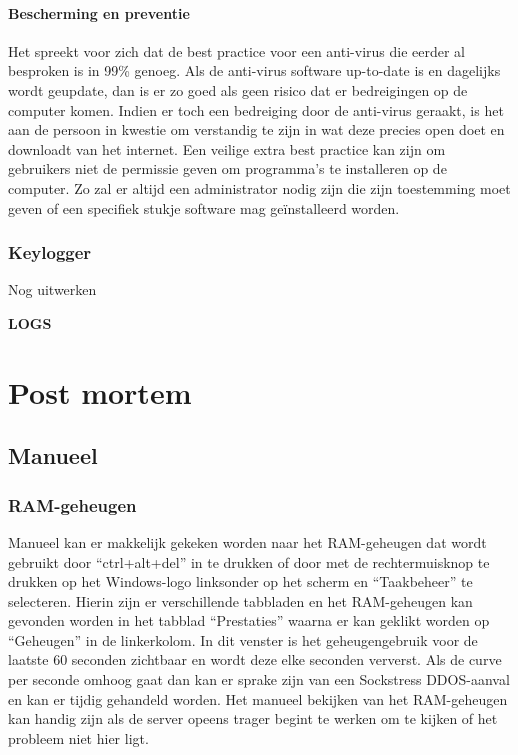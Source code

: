 \documentclass[pdftex,a4paper,12pt]{report}
\begin{document}
\subsubsection{Bescherming en preventie}
Het spreekt voor zich dat de best practice voor een anti-virus die eerder al besproken is in 99\% genoeg. Als de anti-virus software up-to-date is en dagelijks wordt geupdate, dan is er zo goed als geen risico dat er bedreigingen op de computer komen. Indien er toch een bedreiging door de anti-virus geraakt, is het aan de persoon in kwestie om verstandig te zijn in wat deze precies open doet en downloadt van het internet. Een veilige extra best practice kan zijn om gebruikers niet de permissie geven om programma's te installeren op de computer. Zo zal er altijd een administrator nodig zijn die zijn toestemming moet geven of een specifiek stukje software mag geïnstalleerd worden.

\subsection{Keylogger}
Nog uitwerken



\textbf{LOGS}

\chapter{Post mortem}
\section{Manueel}
\subsection{RAM-geheugen}
Manueel kan er makkelijk gekeken worden naar het RAM-geheugen dat wordt gebruikt door "`ctrl+alt+del"' in te drukken of door met de rechtermuisknop te drukken op het Windows-logo linksonder op het scherm en "`Taakbeheer"' te selecteren. Hierin zijn er verschillende tabbladen en het RAM-geheugen kan gevonden worden in het tabblad "`Prestaties"' waarna er kan geklikt worden op "`Geheugen"' in de linkerkolom. In dit venster is het geheugengebruik voor de laatste 60 seconden zichtbaar en wordt deze elke seconden ververst. Als de curve per seconde omhoog gaat dan kan er sprake zijn van een Sockstress DDOS-aanval en kan er tijdig gehandeld worden. Het manueel bekijken van het RAM-geheugen kan handig zijn als de server opeens trager begint te werken om te kijken of het probleem niet hier ligt.
\end{document}
